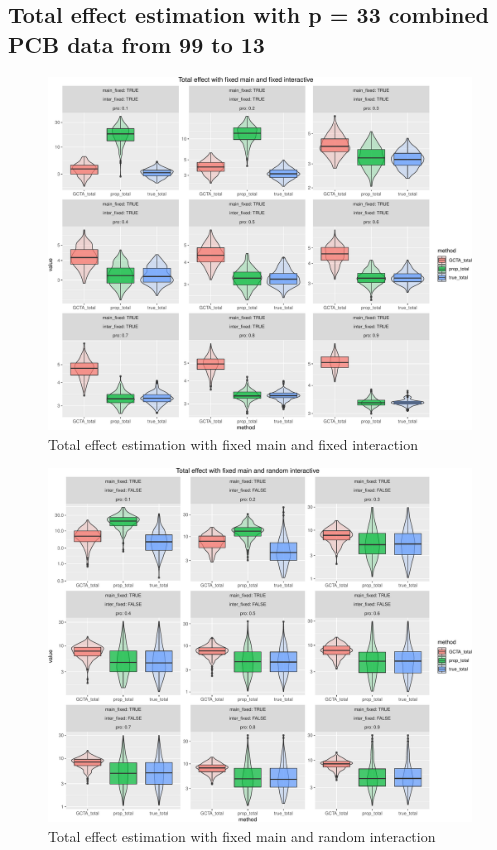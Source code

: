 \documentclass[]{article}
\begin{document}
\newpage

\subsection{Total effect estimation with p = 33 combined PCB data from
99 to
13}\label{total-effect-estimation-with-p-33-combined-pcb-data-from-99-to-13}

\begin{figure}
\centering
\includegraphics{Simulation_report_files/figure-latex/Total effect fixed fixed 33-1.pdf}
\caption{Total effect estimation with fixed main and fixed interaction}
\end{figure}

\begin{figure}
\centering
\includegraphics{Simulation_report_files/figure-latex/Total effect fixed random 33-1.pdf}
\caption{Total effect estimation with fixed main and random interaction}
\end{figure}
\end{document}
